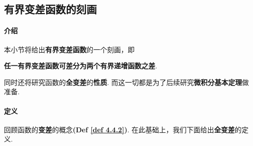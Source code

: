 \newpage
\subsection{有界变差函数的刻画}
\paragraph{介绍}
	本小节将给出\textbf{有界变差函数}的一个刻画，即
	\begin{center}
		\textbf{任一有界变差函数可差分为两个有界递增函数之差}.
	\end{center}
	同时还将研究函数的\textbf{全变差}的\textbf{性质}. 而这一切都是为了后续研究\textbf{微积分基本定理}做准备.
	
\vspace{2em}
\paragraph{定义}
	回顾函数的\textbf{变差}的概念\textbf{(Def \ref{def 4.4.2})}. 在此基础上，我们下面给出\textbf{全变差}的定义.

